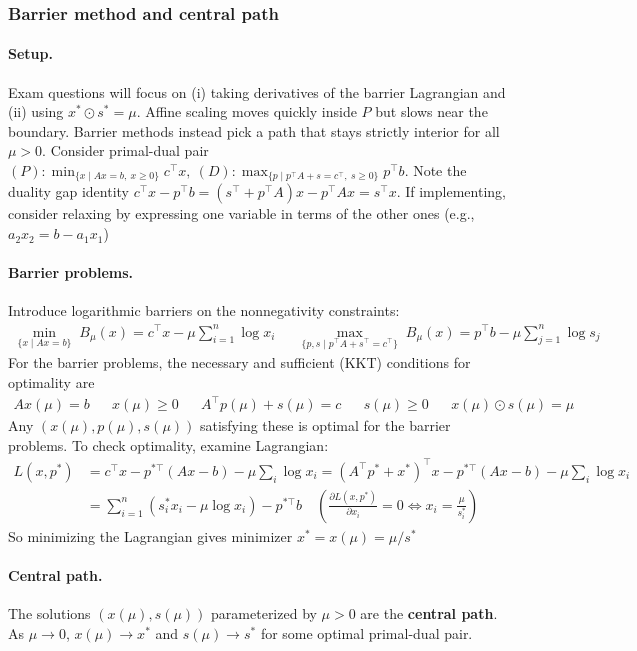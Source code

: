 \documentclass{article}
\begin{document}
\subsubsection{Barrier method and central path}
\paragraph{Setup.}
Exam questions will focus on (i) taking derivatives of the barrier Lagrangian and
(ii) using $x^*\odot s^*=\mu$.  
Affine scaling moves quickly inside $P$ but slows near the boundary.  
Barrier methods instead pick a path that stays strictly interior for all $\mu>0$.
Consider primal-dual pair $(P): \min_{\{x\mid Ax=b,\ x\geq 0\}}c^\top x,\ (D): \max_{\{p\mid p^\top A + s = c^\top,\ s\geq 0\}}p^\top b$. Note the duality gap identity $c^\top x - p^\top b = (s^\top + p^\top A)x - p^\top Ax = s^\top x$. If implementing, consider relaxing by expressing one variable in terms of the other ones (e.g., $a_2x_2 = b - a_1x_1$)

\paragraph{Barrier problems.} Introduce logarithmic barriers on the nonnegativity constraints:
\begin{align*}
    \min_{\{x\mid Ax=b\}}\; B_\mu(x)=c^\top x - \mu\sum_{i=1}^n\log x_i
    && \max_{\{p,s\mid p^\top A + s^\top = c^\top\}}\; B_\mu(x)=p^\top b - \mu\sum_{j=1}^n\log s_j
\end{align*}
For the barrier problems, the necessary and sufficient (KKT) conditions for optimality are
\begin{align*}
    Ax(\mu) = b && x(\mu)\geq 0 && A^\top p(\mu) + s(\mu) = c && s(\mu) \geq 0 && x(\mu)\odot s(\mu) = \mu
\end{align*}
Any $(x(\mu),p(\mu),s(\mu))$ satisfying these is optimal for the barrier problems. To check optimality, examine Lagrangian:
{\footnotesize
\begin{align*}
    L(x,p^*) &= c^\top x - p^{*\top}(Ax-b) - \mu\sum_i\log x_i 
    = (A^\top p^* + x^*)^\top x - p^{*\top}(Ax - b)- \mu\sum_i\log x_i\\ 
    &= \sum_{i=1}^n \left(s^*_ix_i- \mu\log x_i\right) - p^{*\top}b 
    \quad \left(\tfrac{\partial L(x,p^*)}{\partial x_i} = 0\iff x_i = \tfrac{\mu}{s^*_i}\right)
\end{align*}
} So minimizing the Lagrangian gives minimizer $x^* = x(\mu) = \mu / s^*$

\paragraph{Central path.}
The solutions $(x(\mu),s(\mu))$ parameterized by $\mu>0$ are the \textbf{central path}.  
As $\mu\to0$, $x(\mu)\to x^*$ and $s(\mu)\to s^*$ for some optimal primal-dual pair.
\end{document}
